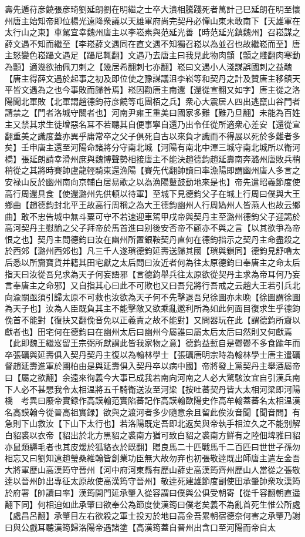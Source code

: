 壽先遁苻彦饒張彦琦劉延朗劉在明繼之士卒大潰相騰踐死者萬計己巳延朗在明至懷州唐主始知帝即位楊光遠降衆議以天雄軍府尚完契丹必憚山東未敢南下【天雄軍在太行山之東】車駕宜幸魏州唐主以李崧素與范延光善【時范延光鎮魏州】召崧謀之薛文遇不知而繼至【李崧薛文遇同在直文遇不知獨召崧以為並召也故繼崧而至】唐主怒變色崧躡文遇足【躡尼輒翻】文遇乃去唐主曰我見此物肉顫【顫之賤翻肉寒動為顫】適幾欲抽佩刀刺之【幾居希翻刺七亦翻】崧曰文遇小人淺謀誤國刺之益醜【唐主得薛文遇於起事之初及即位使之豫謀議沮李崧等和契丹之計及贊唐主移鎮天平皆文遇為之也今事敗而歸咎焉】崧因勸唐主南還【還從宣翻又如字】唐主從之洛陽聞北軍敗【北軍謂趙德鈞苻彦饒等屯團栢之兵】衆心大震居人四出逃竄山谷門者請禁之【門者洛城守關者也】河南尹雍王重美曰國家多難【難乃旦翻】未能為百姓主又禁其求生徒增惡名耳不若聽其自便事寧自還乃出令任從所適衆心差安【還從宣翻重美之識度蓋亦異乎庸常卒之父子俱死自古以來負才識而不得展以死於多難者多矣】壬申唐主還至河陽命諸將分守南北城【河陽有南北中潬三城守南北城所以衛河橋】張延朗請幸滑州庶與魏博聲勢相接唐主不能決趙德鈞趙延壽南奔潞州唐敗兵稍稍從之其將時賽帥盧龍輕騎東還漁陽【賽先代翻帥讀曰率漁陽即謂幽州唐人多言之安禄山反於幽州南向京輔白居易歌之以為漁陽鼙鼓動地來是也】帝先遣昭義節度使高行周還具食【使還潞州先供頓以待軍】至城下見德鈞父子在城上行周曰僕與大王鄉曲【趙德鈞封北平王故高行周稱之為大王德鈞幽州人行周媯州人皆燕人也故云鄉曲】敢不忠告城中無斗粟可守不若速迎車駕甲戌帝與契丹主至潞州德鈞父子迎謁於高河契丹主慰諭之父子拜帝於馬首進曰别後安否帝不顧亦不與之言【以其欲爭為帝恨之也】契丹主問德鈞曰汝在幽州所置銀鞍契丹直何在德鈞指示之契丹主命盡殺之於西郊【潞州西郊也】凡三千人遂瑣德鈞延壽送歸其國【瑣與鎖同】德鈞見舒嚕太后悉以所齎寶貨并籍其田宅獻之太后問曰汝近者何為往太原德鈞曰奉唐主之命太后指天曰汝從吾兒求為天子何妄語邪【言德鈞舉兵往太原欲從契丹主求為帝耳何乃妄言奉唐主之命邪】又自指其心曰此不可欺也又曰吾兒將行吾戒之云趙大王若引兵北向渝關亟須引歸太原不可救也汝欲為天子何不先擊退吾兒徐圖亦未晩【徐圖謂徐圖為天子也】汝為人臣既負其主不能擊敵又欲乘亂邀利所為如此何面目復求生乎德鈞俛首不能對【復扶又翻俛音免以正義責之故不能對】又問器玩在此【謂德鈞所齎以獻者也】田宅何在德鈞曰在幽州太后曰幽州今屬誰曰屬太后太后曰然則又何獻焉【此即魏王繼岌留王宗弼所獻謂此皆我家物之意】德鈞益慙自是鬱鬱不多食踰年而卒張礪與延壽俱入契丹契丹主復以為翰林學士【張礪唐明宗時為翰林學士唐主遣礪督趙延壽進軍於圑柏由是與延壽俱入契丹卒以病中國】帝將發上黨契丹主舉酒屬帝曰【屬之欲翻】余遠來徇義今大事已成我若南向河南之人必大驚駭汝宜自引漢兵南下人必不甚愳我令太相温將五千騎衛送汝至河梁【按吐蕃契丹皆大太相河梁即河陽橋　考異曰廢帝實録作高謨翰范實陷蕃記作高謨翰歐陽史作高牟翰蓋蕃名太相温漢名高謨翰今從晉高祖實録】欲與之渡河者多少隨意余且留此俟汝音聞【聞音問】有急則下山救汝【下山下太行也】若洛陽既定吾即北返矣與帝執手相泣久之不能别解白貂裘以衣帝【貂出於北方黑貂之裘南方猶可致白貂之裘南方鮮有之陸佃埤雅曰貂亦鼠類縟毛者也其皮煖於狐貉衣於既翻】贈良馬二十匹戰馬千二百匹曰世世子孫勿相忘又曰劉知遠趙瑩桑維翰皆創業功臣無大故勿弃也初張敬逹既出師唐主遣左金吾大將軍歷山高漢筠守晉州【河中府河東縣有歷山薛史高漢筠齊州歷山人當從之張敬逹以晉州帥出專征太原故使高漢筠守晉州】敬逹死建雄節度副使田承肇帥衆攻漢筠於府署【帥讀曰率】漢筠開門延承肇入從容謂曰僕與公俱受朝寄【從千容翻朝直遥翻下同】何相迫如此承肇曰欲奉公為節度使漢筠曰僕老矣義不為亂首死生惟公所處【處昌呂翻】承肇目左右欲殺之軍士投刃於地曰高金吾累朝宿德奈何害之承肇乃謝曰與公戲耳聽漢筠歸洛陽帝遇諸塗【高漢筠蓋自晉州出含口至河陽而帝自太